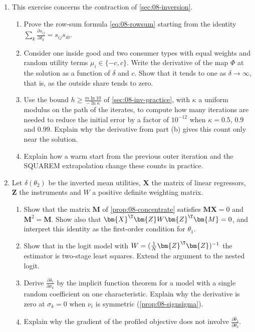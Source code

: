 \begin{enumerate}[label=\arabic*., leftmargin=*, itemsep=6pt]
\item This exercise concerns the contraction of \cref{sec:08-inversion}.
\begin{enumerate}[label=(\alph*)]
  \item Prove the row-sum formula \eqref{eq:08-rowsum} starting from the identity
  $\sum_k \frac{\partial s_{ij}}{\partial \delta_k} = s_{ij}s_{i0}$.
  \item Consider one inside good and two consumer types with equal weights and random utility terms $\mu_{i}
  \in \{-c, c\}$. Write the derivative of the map $\Phi$ at the solution as a function of $\delta$ and $c$.
  Show that it tends to one as $\delta \to \infty$, that is, as the outside share tends to zero.
  \item Use the bound $h \geq \frac{m\ln 10}{-\ln\kappa}$ of \cref{sec:08-inv-practice}, with $\kappa$ a uniform
  modulus on the path of the iterates, to compute how many iterations are needed to reduce the initial error by a
  factor of $10^{-12}$ when $\kappa = 0.5$, $0.9$ and $0.99$. Explain why the derivative from part (b) gives this
  count only near the solution.
  \item Explain how a warm start from the previous outer iteration and the SQUAREM extrapolation change these
  counts in practice.
\end{enumerate}

\item Let $\delta(\theta_2)$ be the inverted mean utilities, $\bm{X}$ the matrix of linear regressors, $\bm{Z}$ the
instruments and $W$ a positive definite weighting matrix.
\begin{enumerate}[label=(\alph*)]
  \item Show that the matrix $\bm{M}$ of \cref{prop:08-concentrate} satisfies $\bm{M}\bm{X} = 0$ and
  $\bm{M}^2 = \bm{M}$. Show also that $\bm{X}^\T\bm{Z}W\bm{Z}^\T\bm{M} = 0$, and interpret this identity as the
  first-order condition for $\theta_1$.
  \item Show that in the logit model with $W = (\frac{1}{N}\bm{Z}^\T\bm{Z})^{-1}$ the estimator is two-stage least
  squares. Extend the argument to the nested logit.
  \item Derive $\frac{\partial \delta_t}{\partial \sigma_k}$ by the implicit function theorem for a model with a
  single random coefficient on one characteristic. Explain why the derivative is zero at $\sigma_k = 0$ when
  $\nu_i$ is symmetric (\cref{prop:08-signsigma}).
  \item Explain why the gradient of the profiled objective does not involve
  $\frac{\partial \hat\theta_1}{\partial \theta_2}$.
\end{enumerate}


\end{enumerate}
